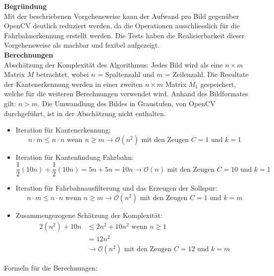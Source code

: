 \textbf{Begründung}\\[0.2cm]
Mit der beschriebenen Vorgehensweise kann der Aufwand pro Bild gegenüber OpenCV deutlich reduziert werden, da die Operationen ausschliesslich für die Fahrbahnerkennung erstellt werden. Die Tests haben die Realisierbarkeit dieser Vorgehensweise als machbar und fexibel aufgezeigt.\\[0.2cm]
\textbf{Berechnungen}\\[0.2cm]
Abschätzung der Komplexität des Algorithmus: Jedes Bild wird als eine $n\times{m}$ Matrix $M$ betrachtet, wobei $n$ = Spaltenzahl und $m$ = Zeilenzahl. Die Resultate der Kantenerkennung werden in einer zweiten $n\times{m}$ Matrix $M_1$ gespeichert, welche für die weiteren Berechnungen verwendet wird. Anhand des Bildformates gilt: $n>m$. Die Umwandlung des Bildes in Graustufen, von OpenCV durchgeführt, ist in der Abschätzung nicht enthalten.
\begin{itemize}
\item Iteration für Kantenerkennung:
\[
n \cdot m \leq n \cdot n \text{ wenn } n\geq m \rightarrow \mathcal{O}(n^2) \text{ mit den Zeugen }C=1 \text{ und } k = 1
\]
\item Iteration für Kantenfindung Fahrbahn:
\[
\frac{1}{2}(10n) + \frac{1}{2}(10n) = 5n + 5n = 10n \rightarrow \mathcal{O}(n) \text{ mit den Zeugen }C=10 \text{ und } k = 1
\]
\item Iteration für Fahrbahnausfilterung und das Erzeugen der Sollspur:
\[
n \cdot m \leq n \cdot n \text{ wenn } n\geq m \rightarrow \mathcal{O}(n^2) \text{ mit den Zeugen }C=1 \text{ und } k = m
\]
\item Zusammengezogene Schätzung der Komplexität:
\begin{align*}
2(n^2) + 10n &\leq 2n^2 + 10n^2 \text{ wenn } n\geq 1\\
             &= 12n^2\\
             &\rightarrow \mathcal{O}(n^2) \text{ mit den Zeugen }C=12 \text{ und } k = m
\end{align*}
\end{itemize}
Formeln für die Berechnungen:
